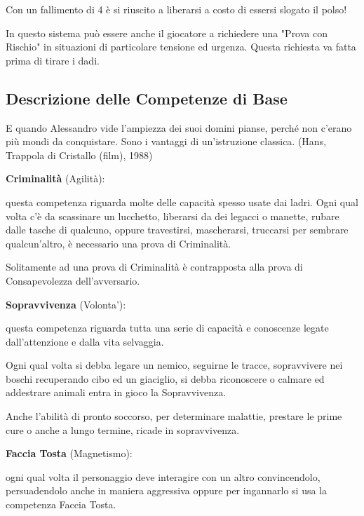 \documentclass[a4paper,11pt,twoside,openany]{book}
\begin{document}
Con un fallimento di 4 è si riuscito a liberarsi a costo di essersi slogato il polso!


In questo sistema può essere anche il giocatore a richiedere una "Prova con Rischio" in situazioni di particolare tensione ed urgenza. Questa richiesta va fatta prima di tirare i dadi.

\pagebreak

\subsection{Descrizione delle Competenze di Base}

\label{descrizione-delle-competenze-di-base}
\begin{tcolorbox}[enhanced,arc=5pt,boxrule=0.3pt]{
		E quando Alessandro vide l'ampiezza dei suoi domini pianse, perché non c'erano più mondi da conquistare. Sono i vantaggi di un'istruzione classica. (Hans, Trappola di Cristallo (film), 1988)
	}\end{tcolorbox}\medskip

\textbf{Criminalità} (Agilità):

questa competenza riguarda molte delle capacità spesso usate dai ladri. Ogni qual volta c'è da scassinare un lucchetto, liberarsi da dei legacci o manette, rubare dalle tasche di qualcuno, oppure travestirsi, mascherarsi, truccarsi per sembrare qualcun'altro, è necessario una prova di Criminalità.

Solitamente ad una prova di Criminalità è contrapposta alla prova di Consapevolezza dell'avversario.

\textbf{Sopravvivenza} (Volonta'):

questa competenza riguarda tutta una serie di capacità e conoscenze legate dall'attenzione e dalla vita selvaggia.

Ogni qual volta si debba legare un nemico, seguirne le tracce, sopravvivere nei boschi recuperando cibo ed un giaciglio,  si debba riconoscere o calmare ed addestrare animali entra in gioco la Sopravvivenza.

Anche l'abilità di pronto soccorso, per determinare malattie, prestare le prime cure o anche a lungo termine, ricade in sopravvivenza.

\textbf{Faccia Tosta} (Magnetismo):

ogni qual volta il personaggio deve interagire con un altro convincendolo, persuadendolo anche in maniera aggressiva oppure per ingannarlo si usa la competenza Faccia Tosta.
\end{document}
